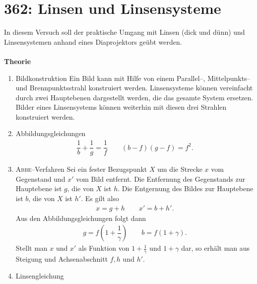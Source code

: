 
\newpage
\section{362: Linsen und Linsensysteme}
In diesem Versuch soll der praktische Umgang mit Linsen (dick und dünn) und Linsensystemen anhand eines Diaprojektors geübt werden.\\\\
\textbf{Theorie} 
\begin{enumerate}[label=--]
        \item Bildkonstruktion \hspace{25pt}
                Ein Bild kann mit Hilfe von einem Parallel--, Mittelpunkts-- und Brennpunktsstrahl konstruiert werden.
                Linsensysteme können vereinfacht durch zwei Hauptebenen dargestellt werden, die das gesamte System ersetzen.
                Bilder eines Linsensystems können weiterhin mit diesen drei Strahlen konstruiert werden.
        \item Abbildungsgleichungen \hspace{25pt}
                \begin{align} 
                        \dfrac{1}{b}+\dfrac{1}{g}=\dfrac{1}{f}\qquad \left(b-f\right)\left(g-f\right)=f^2
                .\end{align} 
        \item \textsc{Abbe}--Verfahren \hspace{25pt}
                Sei ein fester Bezugspunkt $X$ um die Strecke $x$ vom Gegenstand und $x'$ vom Bild entfernt.
                Die Entfernung des Gegenstands zur Hauptebene ist $g$, die von $X$ ist $h$.
                Die Entgernung des Bildes zur Hauptebene ist $b$, die von $X$ ist $h'$.
                Es gilt also
                \begin{align} 
                        x=g+h\qquad x'=b+h'
                .\end{align} 
                Aus den Abbildungsgleichungen folgt dann
                \begin{align} 
                        g=f\left(1+\dfrac{1}{\gamma }\right)\qquad b=f\left(1+\gamma \right)
                .\end{align} 
                Stellt man $x$ und $x'$ als Funktion von $1+\tfrac{1}{\gamma }$ und $1+\gamma $ dar, so erhält man aus Steigung und Achsenabschnitt $f,h$ und $h'$. 
        \item Linsengleichung \hspace{25pt}

\end{enumerate}
